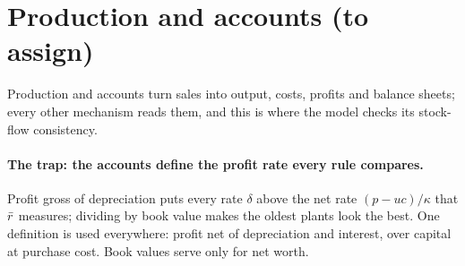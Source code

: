 \section{Production and accounts (to assign)}\label{sec:accounts}

Production and accounts turn sales into output, costs, profits and balance sheets; every
other mechanism reads them, and this is where the model checks its stock-flow consistency.

\paragraph{The trap: the accounts define the profit rate every rule compares.} Profit gross
of depreciation puts every rate $\delta$ above the net rate $(p - uc)/\kappa$ that $\bar r$
measures; dividing by book value makes the oldest plants look the best. One definition is
used everywhere: profit net of depreciation and interest, over capital at purchase cost.
Book values serve only for net worth.


